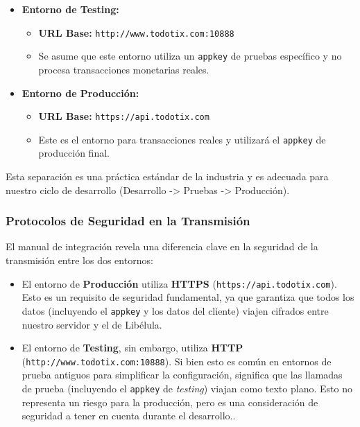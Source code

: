     \begin{itemize}
        \item \textbf{Entorno de Testing:}
        \begin{itemize}
            \item \textbf{URL Base:} \texttt{http://www.todotix.com:10888}
            \item Se asume que este entorno utiliza un \texttt{appkey} de pruebas específico y no procesa transacciones 
            monetarias reales.
        \end{itemize}
        \item \textbf{Entorno de Producción:}
        \begin{itemize}
            \item \textbf{URL Base:} \texttt{https://api.todotix.com}
            \item Este es el entorno para transacciones reales y utilizará el \texttt{appkey} de producción final.
        \end{itemize}
    \end{itemize}
    Esta separación es una práctica estándar de la industria y es adecuada para nuestro ciclo de desarrollo 
    (Desarrollo -> Pruebas -> Producción).\par

    \subsubsection{Protocolos de Seguridad en la Transmisión}
    El manual de integración revela una diferencia clave en la seguridad de la transmisión entre los dos entornos:
    \begin{itemize}
        \item El entorno de \textbf{Producción} utiliza \textbf{HTTPS} (\texttt{https://api.todotix.com}). Esto es un requisito de seguridad fundamental, ya que garantiza que todos los datos (incluyendo el \texttt{appkey} y los datos del cliente) viajen cifrados entre nuestro servidor y el de Libélula.
        \item El entorno de \textbf{Testing}, sin embargo, utiliza \textbf{HTTP} (\texttt{http://www.todotix.com:10888}). Si bien esto es común en entornos de prueba antiguos para simplificar la configuración, significa que las llamadas de prueba (incluyendo el \texttt{appkey} de \emph{testing}) viajan como texto plano. Esto no representa un riesgo para la producción, pero es una consideración de seguridad a tener en cuenta durante el desarrollo..
    \end{itemize}